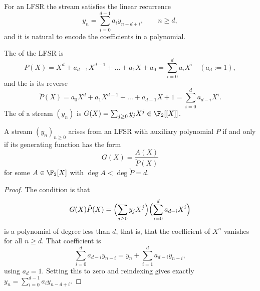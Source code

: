 \begin{center}
\end{center}

For an LFSR the stream satisfies the linear recurrence
$$y_n = \sum_{i=0}^{d-1}a_iy_{n-d+i}, \qquad n \ge d,$$
and it is natural to encode the coefficients in a polynomial.

\begin{definition}
	The  of the LFSR is
	$$P(X) = X^d + a_{d-1}X^{d-1}+\dots+a_1X+a_0 = \sum_{i=0}^d a_iX^i \quad (a_d := 1),$$
	and the  is its reverse
	$$\check P(X) = a_0X^d+a_1X^{d-1}+\dots+a_{d-1}X+1 = \sum_{i=0}^d a_{d-i}X^i.$$
	The  of a stream $(y_n)$ is $G(X) = \sum_{j\ge0}y_jX^j \in \F_2[[X]]$.
\end{definition}

\begin{theorem}\label{thm:lfsrgf}
	A stream $(y_n)_{n\ge0}$ arises from an LFSR with auxiliary polynomial $P$ if and only if its generating function has the form
	$$G(X) = \frac{A(X)}{\check P(X)}$$
	for some $A \in \F_2[X]$ with $\deg A < \deg\check P = d$.
\end{theorem}

\begin{proof}
	The condition is that
	$$G(X)\check P(X) = \Bigl(\sum_{j\ge0}y_jX^j\Bigr)\Bigl(\sum_{i=0}^d a_{d-i}X^i\Bigr)$$
	is a polynomial of degree less than $d$, that is, that the coefficient of $X^n$ vanishes for all $n \ge d$. That coefficient is
	$$\sum_{i=0}^d a_{d-i}y_{n-i} = y_n + \sum_{i=1}^{d}a_{d-i}y_{n-i},$$
	using $a_d = 1$. Setting this to zero and reindexing gives exactly $y_n = \sum_{i=0}^{d-1}a_iy_{n-d+i}$.
\end{proof}

